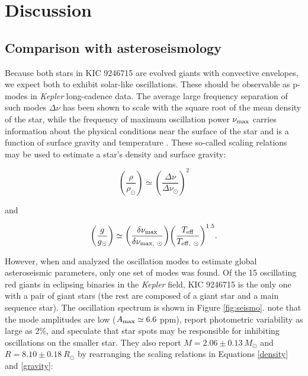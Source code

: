\section{Discussion}\label{discuss}

\subsection{Comparison with asteroseismology}\label{seismo}

Because both stars in KIC 9246715 are evolved giants with convective envelopes, we expect both to exhibit solar-like oscillations. These should be observable as p-modes in \emph{Kepler} long-cadence data. The average large frequency separation of such modes $\Delta \nu$ has been shown to scale with the square root of the mean density of the star, while the frequency of maximum oscillation power $\nu_{\rm{max}}$ carries information about the physical conditions near the surface of the star and is a function of surface gravity and temperature \citep{cha13}. These so-called scaling relations may be used to estimate a star's density and surface gravity:

\begin{equation} %
{\left( {\frac{\rho}{\rho_{\odot}}} \right)} \simeq {\left( {\frac{\Delta \nu}{\Delta \nu_{\odot}}} \right)}^{2}
\end{equation}

and

\begin{equation} %
{\left( \frac{g}{g_{\odot}} \right)} \simeq {\left( \frac{\delta \nu_{\rm{max}}}{\delta \nu_{\rm{max}, \ \odot}} \right)} {\left( \frac{T_{\rm{eff}}}{T_{\rm{eff}, \ \odot}} \right)}^{1.5}.
\end{equation}

However, when \citet{gau13} and \citet{gau14} analyzed the oscillation modes to estimate global asteroseismic parameters, only one set of modes was found. Of the 15 oscillating red giants in eclipsing binaries in the \emph{Kepler} field, KIC 9246715 is the only one with a pair of giant stars (the rest are composed of a giant star and a main sequence star). The oscillation spectrum is shown in Figure \ref{fig:seismo}. \citet{gau14} note that the mode amplitudes are low ($A_{\rm{max}} \simeq 6.6$ ppm), report photometric variability as large as 2\%, and speculate that star spots may be responsible for inhibiting oscillations on the smaller star. They also report $M = 2.06 \pm 0.13 \ M_{\odot}$ and $R = 8.10 \pm 0.18 \ R_{\odot}$ by rearranging the scaling relations in Equations \ref{density} and \ref{gravity}:

